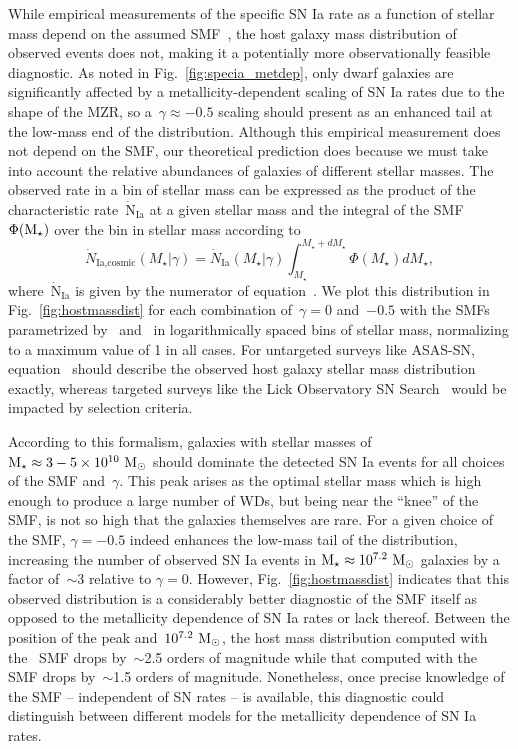 \documentclass[ms.tex]{subfiles}
\begin{document}
While empirical measurements of the specific SN Ia rate as a function of
stellar mass depend on the assumed SMF~\citep{Gandhi2022}, the host galaxy
mass distribution of observed events does not, making it a potentially more
observationally feasible diagnostic.
As noted in Fig.~\ref{fig:specia_metdep}, only dwarf galaxies are
significantly affected by a metallicity-dependent scaling of SN Ia rates due to
the shape of the MZR, so a~$\gamma \approx -0.5$ scaling should present as an
enhanced tail at the low-mass end of the distribution.
Although this empirical measurement does not depend on the SMF, our theoretical
prediction does because we must take into account the relative abundances of
galaxies of different stellar masses.
The observed rate in a bin of stellar mass can be expressed as the product
of the characteristic rate~$\dot{\text{N}}_\text{Ia}$ at a given stellar mass
and the integral of the SMF~$\Phi(\text{M}_\star)$ over the bin in stellar mass
according to
\begin{equation}
\dot{N}_\text{Ia,cosmic}(M_\star | \gamma) = \dot{N}_\text{Ia}(M_\star | \gamma)
\int_{M_\star}^{M_\star + dM_\star} \Phi(M_\star) dM_\star,
\label{eq:hostmassdist}
\end{equation}
where~$\dot{\text{N}}_\text{Ia}$ is given by the numerator of
equation~.
We plot this distribution in Fig.~\ref{fig:hostmassdist} for each combination
of~$\gamma = 0$ and~$-0.5$ with the SMFs parametrized by~\citet{Bell2003}
and~\citet{Baldry2012} in logarithmically spaced bins of stellar mass,
normalizing to a maximum value of 1 in all cases.
For untargeted surveys like ASAS-SN, equation~ should
describe the observed host galaxy stellar mass distribution exactly, whereas
targeted surveys like the Lick Observatory SN Search~\citep[LOSS;][]{Li2000,
Filippenko2001} would be impacted by selection criteria.
\par
According to this formalism, galaxies with stellar masses of
$\text{M}_\star \approx 3-5 \times10^{10}~\text{M}_\odot$ should dominate the detected SN Ia
events for all choices of the SMF and~$\gamma$.
This peak arises as the optimal stellar mass which is high enough to produce a
large number of WDs, but being near the ``knee'' of the SMF, is not so high
that the galaxies themselves are rare.
For a given choice of the SMF, $\gamma = -0.5$ indeed enhances the low-mass
tail of the distribution, increasing the number of observed SN Ia events in
$\text{M}_\star \approx 10^{7.2}~\text{M}_\odot$ galaxies by a factor of~$\sim$3 relative to
$\gamma = 0$.
However, Fig.~\ref{fig:hostmassdist} indicates that this observed distribution
is a considerably better diagnostic of the SMF itself as opposed to the
metallicity dependence of SN Ia rates or lack thereof.
Between the position of the peak and~$10^{7.2}~\text{M}_\odot$, the host mass
distribution computed with the~\citet{Bell2003} SMF drops by~$\sim$2.5 orders
of magnitude while that computed with the~\citet{Baldry2012} SMF drops
by~$\sim$1.5 orders of magnitude.
Nonetheless, once precise knowledge of the SMF -- independent of SN rates -- is
available, this diagnostic could distinguish between different models for the
metallicity dependence of SN Ia rates.
\end{document}
